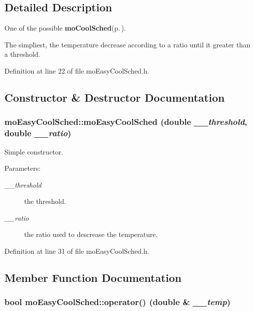 \subsection{Detailed Description}
One of the possible {\bf mo\-Cool\-Sched}{\rm (p.\,\pageref{classmo_cool_sched})}. 

The simpliest, the temperature decrease according to a ratio until it greater than a threshold. 



Definition at line 22 of file mo\-Easy\-Cool\-Sched.h.

\subsection{Constructor \& Destructor Documentation}
\subsubsection{\setlength{\rightskip}{0pt plus 5cm}mo\-Easy\-Cool\-Sched::mo\-Easy\-Cool\-Sched (double {\em \_\-\_\-threshold}, double {\em \_\-\_\-ratio})\hspace{0.3cm}{\tt  [inline]}}\label{classmo_easy_cool_sched_c556b41343700293bb17e3b20d81e0f2}


Simple constructor. 

\begin{Desc}
\item[Parameters:]
\begin{description}
\item[{\em \_\-\_\-threshold}]the threshold. \item[{\em \_\-\_\-ratio}]the ratio used to descrease the temperature. \end{description}
\end{Desc}


Definition at line 31 of file mo\-Easy\-Cool\-Sched.h.

\subsection{Member Function Documentation}
\subsubsection{\setlength{\rightskip}{0pt plus 5cm}bool mo\-Easy\-Cool\-Sched::operator() (double \& {\em \_\-\_\-temp})\hspace{0.3cm}{\tt  [inline]}}\label{classmo_easy_cool_sched_ca08df878417ef1124e6933a9c2d7a0b}


